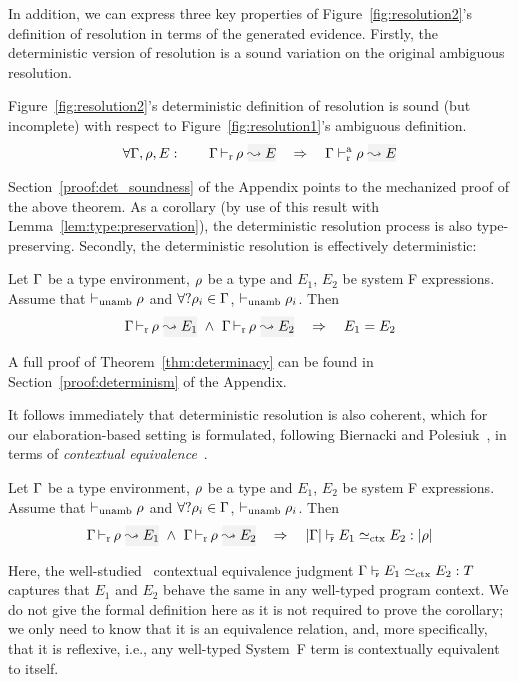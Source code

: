 In addition, we can express three key properties of Figure~\ref{fig:resolution2}'s
definition of resolution in terms of the generated evidence.
Firstly, the deterministic version of resolution is a sound variation on the original ambiguous
resolution.
\begin{theorem}[Soundness]
Figure~\ref{fig:resolution2}'s deterministic definition of resolution is sound (but
incomplete) with respect to Figure~\ref{fig:resolution1}'s ambiguous definition.
\[\forall \tenv, \rulet, E: \quad\quad \dres{\tenv}{\rulet}{E} \quad\Rightarrow\quad \ares{\tenv}{\rulet}{E} \]
\end{theorem}
Section~\ref{proof:det_soundness} of
the Appendix points to the mechanized proof of the above theorem.
As a corollary (by use of this result with Lemma~\ref{lem:type:preservation}), the
deterministic resolution process is also type-preserving.
Secondly, the deterministic resolution is effectively deterministic:
\begin{theorem}[Determinacy]\label{thm:determinacy}
Let $\Gamma$ be a type environment, $\rho$ be a type and $E_1$, $E_2$ be system F expressions.
Assume that ${ \vdash_{\mathrm{unamb}} \rho}$ and $\forall ?\rho_i\in\Gamma$, ${ \vdash_{\mathrm{unamb}} \rho_i}$. Then
\[ %
     \dres{\tenv}{\rulet}{E_1} ~\wedge~ 
     \dres{\tenv}{\rulet}{E_2} \quad\Rightarrow\quad E_1 = E_2 \]
\end{theorem}
A full proof of Theorem~\ref{thm:determinacy} can be found in
Section~\ref{proof:determinism} of the Appendix.

It follows immediately that deterministic resolution is also coherent,
which for our elaboration-based setting is formulated, following Biernacki and Polesiuk~, in
terms of \emph{contextual equivalence}~\cite{morris}.
\begin{corollary}[Coherence]\label{lem:coherence}
Let $\Gamma$ be a type environment, $\rho$ be a type and $E_1$, $E_2$ be system F expressions.
Assume that ${ \vdash_{\mathrm{unamb}} \rho}$ and $\forall ?\rho_i\in\Gamma$, ${ \vdash_{\mathrm{unamb}} \rho_i}$. Then
\[ %
     \dres{\tenv}{\rulet}{E_1} ~\wedge~ 
     \dres{\tenv}{\rulet}{E_2} \quad\Rightarrow\quad 
     \fctx{\etrans{\tenv}}{E_1}{E_2}{\ttrans[\rulet]} \]
\end{corollary}
Here, the well-studied~\cite{contextual_equivalence} contextual equivalence judgment ${\Gamma \vdash_{\scriptscriptstyle \hspace{-1mm}\mathtt{F}} E_1 \simeq_{\rm ctx} E_2 : T}$ captures
that $E_1$ and $E_2$ behave the same in any well-typed program context. We do
not give the formal definition here as it is not required to prove the
corollary; we only need to know that it is an equivalence relation, and, more
specifically, that it is reflexive, i.e., any well-typed System~F term is
contextually equivalent to itself.

